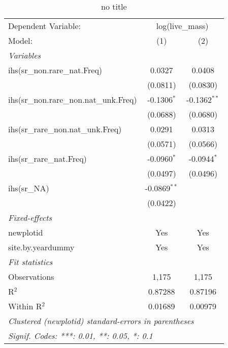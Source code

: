 
\begin{table}[htbp]
   \caption{no title}
   \centering
   \begin{tabular}{lcc}
      \tabularnewline \midrule \midrule
      Dependent Variable: & \multicolumn{2}{c}{log(live\_mass)}\\
      Model:                                  & (1)            & (2)\\  
      \midrule
      \emph{Variables}\\
      ihs(sr\_non.rare\_nat.Freq)             & 0.0327         & 0.0408\\   
                                              & (0.0811)       & (0.0830)\\   
      ihs(sr\_non.rare\_non.nat\_unk.Freq)    & -0.1306$^{*}$  & -0.1362$^{**}$\\   
                                              & (0.0688)       & (0.0680)\\   
      ihs(sr\_rare\_non.nat\_unk.Freq)        & 0.0291         & 0.0313\\   
                                              & (0.0571)       & (0.0566)\\   
      ihs(sr\_rare\_nat.Freq)                 & -0.0960$^{*}$  & -0.0944$^{*}$\\   
                                              & (0.0497)       & (0.0496)\\   
      ihs(sr\_NA)                             & -0.0869$^{**}$ &   \\   
                                              & (0.0422)       &   \\   
      \midrule
      \emph{Fixed-effects}\\
      newplotid                               & Yes            & Yes\\  
      site.by.yeardummy                       & Yes            & Yes\\  
      \midrule
      \emph{Fit statistics}\\
      Observations                            & 1,175          & 1,175\\  
      R$^2$                                   & 0.87288        & 0.87196\\  
      Within R$^2$                            & 0.01689        & 0.00979\\  
      \midrule \midrule
      \multicolumn{3}{l}{\emph{Clustered (newplotid) standard-errors in parentheses}}\\
      \multicolumn{3}{l}{\emph{Signif. Codes: ***: 0.01, **: 0.05, *: 0.1}}\\
   \end{tabular}
\end{table}


